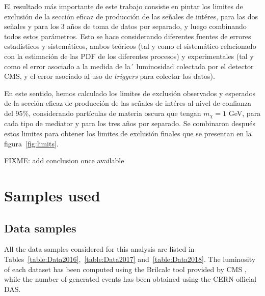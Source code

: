 \documentclass[a4paper, 10pt, openright]{report}
\begin{document}
\begin{appendices}
El resultado m\'{a}s importante de este trabajo consiste en pintar los limites de exclusi\'{o}n de la secci\'{o}n eficaz de producci\'{o}n de las se\~{n}ales de int\'{e}res, para las dos se\~{n}ales y para los 3 a\~{n}os de toma de datos por separado, y luego combinando todos estos par\'{a}metros. Esto se hace considerando diferentes fuentes de errores estad\'{i}sticos y sistem\'{a}ticos, ambos te\'{o}ricos (tal y como el sistem\'{a}tico relacionado con la estimaci\'{o}n de las \ac{PDF} de los diferentes procesos) y experimentales (tal y como el error asociado a la medida de la´ luminosidad colectada por el detector \ac{CMS}, y el error asociado al uso de \textit{triggers} para colectar los datos).

En este sentido, hemos calculado los limites de exclusi\'{o}n observados y esperados de la secci\'{o}n eficaz de producci\'{o}n de las se\~{n}ales de int\'{e}res al nivel de confianza del 95\%, considerando part\'{i}culas de materia oscura que tengan $m_\chi = 1$ GeV, para cada tipo de mediator y para los tres a\~{n}os por separado. Se combinaron despu\'{e}s estos limites para obtener los limites de exclusi\'{o}n finales que se presentan en la figura~\ref{fig:limits}.

\color{red} FIXME: add conclusion once available \color{black}



\chapter{Samples used} \label{appendix:Samples}
\section{Data samples} \label{appendix:DataSamples}

All the data samples considered for this analysis are listed in Tables~\ref{table:Data2016},~\ref{table:Data2017} and~\ref{table:Data2018}. The luminosity of each dataset has been computed using the Brilcalc tool provided by \ac{CMS} \cite{Brilcalc}, while the number of generated events has been obtained using the CERN official \acf{DAS}.


\end{appendices}
\end{document}
